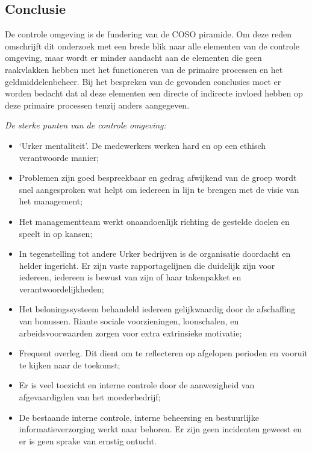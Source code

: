 \subsection*{Conclusie}
De controle omgeving is de fundering van de COSO piramide. Om deze reden omschrijft dit onderzoek met een brede blik naar alle elementen van de controle omgeving, maar wordt er minder aandacht aan de elementen die geen raakvlakken hebben met het functioneren van de primaire processen en het geldmiddelenbeheer. Bij het bespreken van de gevonden conclusies moet er worden bedacht dat al deze elementen een directe of indirecte invloed hebben op deze primaire processen tenzij anders aangegeven. 

\medskip
\noindent
\textit{De sterke punten van de controle omgeving:}
\begin{itemize}
    \item `Urker mentaliteit'. De medewerkers werken hard en op een ethisch verantwoorde manier;
    \item Problemen zijn goed bespreekbaar en gedrag afwijkend van de groep wordt snel aangesproken wat helpt om iedereen in lijn te brengen met de visie van het management;
    \item Het managementteam werkt onaandoenlijk richting de gestelde doelen en speelt in op kansen;
    \item In tegenstelling tot andere Urker bedrijven is de organisatie doordacht en helder ingericht. Er zijn vaste rapportagelijnen die duidelijk zijn voor iedereen, iedereen is bewust van zijn of haar takenpakket en verantwoordelijkheden;
    \item Het beloningssysteem behandeld iedereen gelijkwaardig door de afschaffing van bonussen. Riante sociale voorzieningen, loonschalen, en arbeidsvoorwaarden zorgen voor extra extrinsieke motivatie;
    \item Frequent overleg. Dit dient om te reflecteren op afgelopen perioden en vooruit te kijken naar de toekomst;
    \item Er is veel toezicht en interne controle door de aanwezigheid van afgevaardigden van het moederbedrijf;
    \item De bestaande interne controle, interne beheersing en bestuurlijke informatieverzorging werkt naar behoren. Er zijn geen incidenten geweest en er is geen sprake van ernstig ontucht.
\end{itemize}

